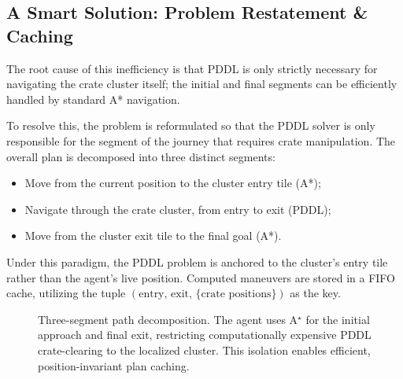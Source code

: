\subsection{A Smart Solution: Problem Restatement \& Caching}
The root cause of this inefficiency is that PDDL is only strictly necessary for navigating the crate cluster itself; 
the initial and final segments can be efficiently handled by standard A* navigation.

To resolve this, the problem is reformulated so that the PDDL solver is only responsible for the segment of the journey that requires crate manipulation.
The overall plan is decomposed into three distinct segments:
\begin{itemize}[noitemsep]
    \item Move from the current position to the cluster entry tile (A*);
    \item Navigate through the crate cluster, from entry to exit (PDDL);
    \item Move from the cluster exit tile to the final goal (A*).
\end{itemize}
Under this paradigm, the PDDL problem is anchored to the cluster's entry tile rather than the agent's live position.
Computed maneuvers are stored in a FIFO cache, utilizing the tuple $(\text{entry},\, \text{exit},\, \{\text{crate positions}\})$ as the key.

\begin{figure}[H]
  \centering
  
  \caption{Three-segment path decomposition. The agent uses A$^\star$ for the initial approach and final exit, 
  restricting computationally expensive PDDL crate-clearing to the localized cluster. 
  This isolation enables efficient, position-invariant plan caching.}
  \label{fig:pddl-segments}
\end{figure}
